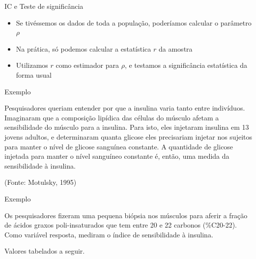 \documentclass{beamer}
\begin{document}
\begin{frame}{IC e Teste de significância}
  \begin{itemize}
  \item Se tivéssemos os dados de toda a \alert<1>{população}, poderíamos
    calcular o \alert<1>{parâmetro} $\rho$
  \item Na prática, só podemos calcular a \alert<2>{estatística} $r$ da \alert<2>{amostra}
  \item Utilizamos $r$ como estimador para $\rho$, e testamos a
    significância estatística da forma usual
  \end{itemize}
\end{frame}

\begin{frame}{Exemplo}
 \begin{example}
   Pesquisadores queriam entender por que a insulina varia tanto entre
   indivíduos. Imaginaram que a \alert<2>{composição lipídica} das células do
   músculo afetam a \alert<3>{sensibilidade do músculo para a insulina}. Para
   isto, eles injetaram insulina em 13 jovens adultos, e determinaram
   quanta glicose eles precisariam injetar nos sujeitos para manter o
   nível de glicose sanguínea constante. A quantidade de glicose
   injetada para manter o nível sanguíneo constante é, então, uma
   medida da sensibilidade à insulina.


    (Fonte: Motulsky, 1995)
  \end{example}
\end{frame}

\begin{frame}{Exemplo}
  \begin{example}
    Os pesquisadores fizeram uma pequena biópsia nos músculos para
    aferir a fração de ácidos graxos poli-insaturados que tem entre 20
    e 22 carbonos (\%C20-22). Como variável resposta, mediram o índice
    de sensibilidade à insulina.
  \end{example}
  Valores tabelados a seguir.
\end{frame}
\end{document}
